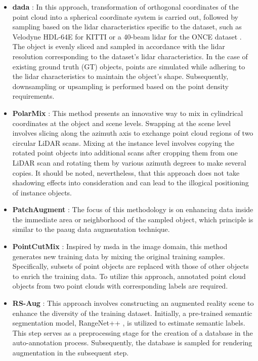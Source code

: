 \begin{itemize}
    \item \textbf{\acrfull{dada}} :  \parencite{dada_2023} In this approach, transformation of orthogonal coordinates of the point cloud into a spherical coordinate system is carried out, followed by sampling based on the lidar characteristics specific to the dataset, such as Velodyne HDL-64E for KITTI \parencite{Geiger2012CVPR} or a 40-beam lidar for the ONCE dataset \parencite{mao2021one}. The object is evenly sliced and sampled in accordance with the lidar resolution corresponding to the dataset's lidar characteristics. In the case of existing ground truth (GT) objects, points are simulated while adhering to the lidar characteristics to maintain the object's shape. Subsequently, downsampling or upsampling is performed based on the point density requirements.
    \item \textbf{PolarMix} : This method \parencite{xiao2022polarmix} presents an innovative way to mix in cylindrical coordinates at the object and scene levels. Swapping at the scene level involves slicing along the azimuth axis to exchange point cloud regions of two circular LiDAR scans. Mixing at the instance level involves copying the rotated point objects into additional scans after cropping them from one LiDAR scan and rotating them by various azimuth degrees to make several copies. It should be noted, nevertheless, that this approach does not take shadowing effects into consideration and can lead to the illogical positioning of instance objects.
    \item \textbf{PatchAugment} : The focus of this methodology \parencite{patch_aug_2021} is on enhancing data inside the immediate area or neighborhood of the sampled object, which principle is similar to the \acrshort{paaug} data augmentation technique.
    \item \textbf{PointCutMix} : Inspired by \acrfull{msda} in the image domain, this method \parencite{pointcutmix_2021} generates new training data by mixing the original training samples. Specifically, subsets of point objects are replaced with those of other objects to enrich the training data. To utilize this approach, annotated point cloud objects from two point clouds with corresponding labels are required.
    \item \textbf{RS-Aug} : This approach \parencite{rs_aug_2023} involves constructing an augmented reality scene to enhance the diversity of the training dataset. Initially, a pre-trained semantic segmentation model, RangeNet++ \parencite{rangenetplus2019}, is utilized to estimate semantic labels. This step serves as a preprocessing stage for the creation of a database in the auto-annotation process. Subsequently, the database is sampled for rendering augmentation in the subsequent step.

\end{itemize}
